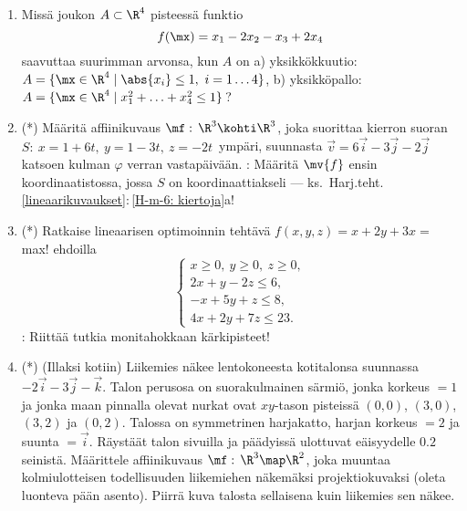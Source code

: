\begin{enumerate}
\item
Missä joukon $A\subset\R^4$ pisteessä funktio
\[
f(\mx)=x_1-2x_2-x_3+2x_4
\]
saavuttaa suurimman arvonsa, kun $A$ on \vspace{1mm}\newline
a) yksikkökkuutio: $A=\{\mx\in\R^4 \mid \abs{x_i} \le 1,\ i=1 \ldots 4\}$, \newline
b) yksikköpallo: $A=\{\mx\in\R^4 \mid x_1^2+\ldots+x_4^2 \le 1\}$\,?

\item (*)
Määritä affiinikuvaus $\mf:\,\R^3\kohti\R^3$, joka suorittaa kierron suoran
$S:\ x=1+6t,\ y=1-3t,\ z=-2t\,$ ympäri, suunnasta $\vec v=6\vec i-3\vec j-2\vec j$ katsoen
kulman $\varphi$ verran vastapäivään. : Määritä $\mv{f}$ ensin koordinaatistossa,
jossa $S$ on koordinaattiakseli --- ks.\
Harj.teht.\,\ref{lineaarikuvaukset}:\,\ref{H-m-6: kiertoja}a!

\item (*)
Ratkaise lineaarisen optimoinnin tehtävä $f(x,y,z)=x+2y+3x=$max! ehdoilla
\[
\begin{cases}
x \ge 0,\ y \ge 0,\ z \ge 0, \\ 2x+y-2z \le 6, \\ -x+5y+z \le 8, \\ 4x+2y+7z \le 23.
\end{cases}
\]
: Riittää tutkia monitahokkaan kärkipisteet!

\item (*) 
(Illaksi kotiin) Liikemies näkee lentokoneesta kotitalonsa suunnassa
$-2\vec i-3\vec j-\vec k$. Talon perusosa on suorakulmainen särmiö, jonka korkeus $=1$ ja
jonka maan pinnalla olevat nurkat ovat $xy$-tason pisteissä $(0,0)$, $(3,0)$, $(3,2)$ ja
$(0,2)$. Talossa on symmetrinen harjakatto, harjan korkeus $=2$ ja suunta $=\vec i$. Räystäät
talon sivuilla ja päädyissä ulottuvat eäisyydelle $0.2$ seinistä. Määrittele affiinikuvaus
$\mf:\,\R^3\map\R^2$, joka muuntaa kolmiulotteisen todellisuuden liikemiehen näkemäksi
projektiokuvaksi (oleta luonteva pään asento). Piirrä kuva talosta sellaisena kuin liikemies
sen näkee.

\end{enumerate}